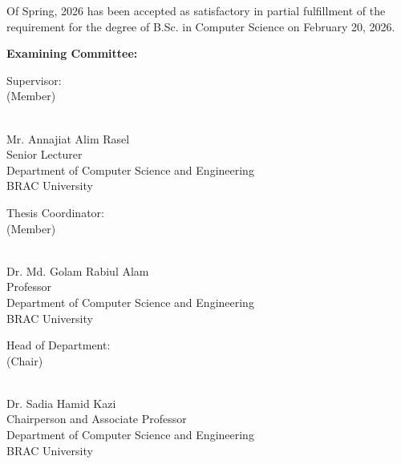 \documentclass[12pt,a4paper]{report}
\begin{document}
Of Spring, 2026 has been accepted as satisfactory in partial fulfillment of the requirement for the degree of B.Sc. in Computer Science on February 20, 2026.

\vspace{1cm}

\textbf{Examining Committee:}

\vspace{1.5cm}

\begin{flushleft}
Supervisor:\\
(Member)
\end{flushleft}

\begin{flushright}
\vspace{-0.5cm}
\hrulefill\\
Mr. Annajiat Alim Rasel\\
Senior Lecturer\\
Department of Computer Science and Engineering\\
BRAC University
\end{flushright}

\vspace{1.5cm}

\begin{flushleft}
Thesis Coordinator:\\
(Member)
\end{flushleft}

\begin{flushright}
\vspace{-0.5cm}
\hrulefill\\
Dr. Md. Golam Rabiul Alam\\
Professor\\
Department of Computer Science and Engineering\\
BRAC University
\end{flushright}

\vspace{1.5cm}

\begin{flushleft}
Head of Department:\\
(Chair)
\end{flushleft}

\begin{flushright}
\vspace{-0.5cm}
\hrulefill\\
Dr. Sadia Hamid Kazi\\
Chairperson and Associate Professor\\
Department of Computer Science and Engineering\\
BRAC University
\end{flushright}
\end{document}
